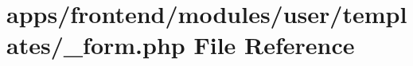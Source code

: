 \hypertarget{frontend_2modules_2user_2templates_2__form_8php}{\section{apps/frontend/modules/user/templates/\-\_\-form.php File Reference}
\label{frontend_2modules_2user_2templates_2__form_8php}
}
